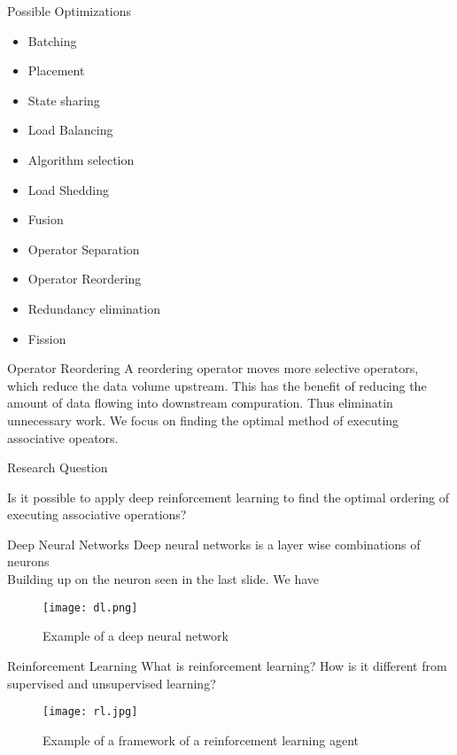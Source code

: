 \begin{frame}{Possible Optimizations}
    \begin{itemize}
        \item Batching
        \item Placement
        \item State sharing
        \item Load Balancing
        \item Algorithm selection
        \item Load Shedding
        \item Fusion
        \item Operator Separation
        \item Operator Reordering
        \item Redundancy elimination
        \item Fission
    \end{itemize}
\end{frame}

\begin{frame}{Operator Reordering}
    A reordering operator moves more selective operators, which reduce the data volume upstream. This has the benefit of reducing the amount of data flowing into downstream compuration. Thus eliminatin unnecessary work. 
    We focus on finding the optimal method of executing associative opeators.
\end{frame}

\begin{frame}{Research Question}
    \begin{center}
    Is it possible to apply deep reinforcement learning to find the optimal ordering of executing associative operations?
    \end{center}
\end{frame}

\begin{frame}{Deep Neural Networks}
    Deep neural networks is a layer wise combinations of neurons\\
    Building up on the neuron seen in the last slide. We have
    \begin{figure}
        \centering
        \texttt{[image: dl.png]}\\
        \caption{Example of a deep neural network}
        \label{fig:dl}
    \end{figure}
\end{frame}

\begin{frame}{Reinforcement Learning}
    What is reinforcement learning? How is it different from supervised and unsupervised learning?
    \begin{figure}
        \centering
        \texttt{[image: rl.jpg]}\\
        \caption{Example of a framework of a reinforcement learning agent }
        \label{fig:rl}
    \end{figure}
\end{frame}

